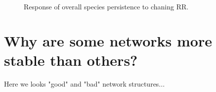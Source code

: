 \begin{figure}
	\centering	
	\renewcommand{\thesubfigure}{}
	\setlength{\subfloatlabelskip}{0pt}
	\caption{Response of overall species persistence to chaning RR.}
	\label{fig:nsp_v_comp_mai05}
\end{figure}

\section{Why are some networks more stable than others?}

Here we looks "good" and "bad" network structures...

